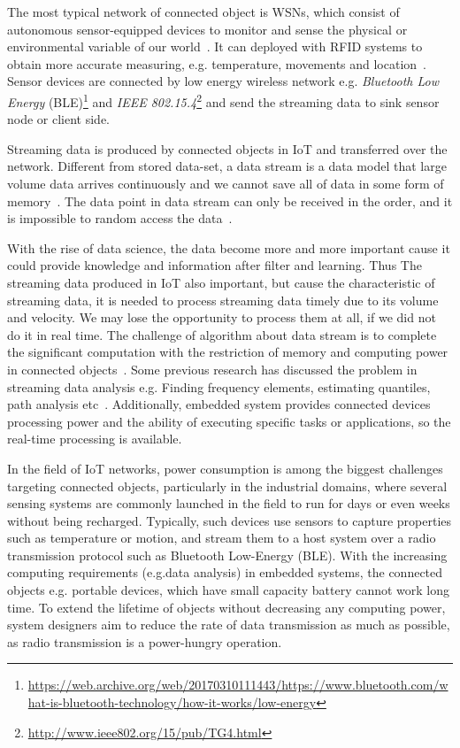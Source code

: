 The most typical network of connected object is WSNs, which consist of
autonomous sensor-equipped devices to monitor and sense the physical or
environmental variable of our world~\cite{lee2015internet, li2016temporal}. It
can deployed with RFID systems to obtain more accurate measuring, e.g.
temperature, movements and location~\cite{lee2015internet, atzori2010b}. Sensor
devices are connected by low energy wireless network e.g.
\emph{Bluetooth Low Energy}
(BLE)\footnote{\url{https://web.archive.org/web/20170310111443/https://www.bluetooth.com/what-is-bluetooth-technology/how-it-works/low-energy}}
and \emph{IEEE 802.15.4}\footnote{\url{http://www.ieee802.org/15/pub/TG4.html}}
and send the streaming data to sink sensor node or client side.

Streaming data is produced by connected objects in IoT and transferred over the
network. Different from stored data-set, a data stream is a data model that
large volume data arrives continuously and we cannot save all of data in some
form of memory~\cite{o2002streaming}. The data point in data stream can only be
received in the order, and it is impossible to random access the
data~\cite{o2002streaming}.

With the rise of data science, the data become more and more important cause it
could provide knowledge and information after filter and learning. Thus The
streaming data produced in IoT also important, but cause the characteristic of
streaming data, it is needed to process streaming data timely due to its volume
and velocity. We may lose the opportunity to process them at all, if we did not
do it in real time. The challenge of algorithm about data stream is to complete
the significant computation with the restriction of memory and computing power
in connected objects~\cite{o2002streaming}. Some previous research has discussed
the problem in streaming data analysis e.g. Finding frequency elements,
estimating quantiles, path analysis etc~\cite{kejariwal2015real}. 
Additionally, embedded system provides connected devices processing power and
the ability of executing specific tasks or applications, so the real-time
processing is available. 


In the field of IoT networks, power consumption is among the biggest challenges
targeting connected objects, particularly in the industrial domains, where
several sensing systems are commonly launched in the field to run for days or
even weeks without being recharged. Typically, such devices use sensors to
capture properties such as temperature or motion, and stream them to a host
system over a radio transmission protocol such as Bluetooth Low-Energy (BLE).
With the increasing computing requirements (e.g.data analysis) in embedded
systems, the connected objects e.g. portable devices, which have small capacity
battery cannot work long time. To extend the lifetime of objects without
decreasing any computing power, system designers aim to reduce the rate of data
transmission as much as possible, as radio transmission is a power-hungry
operation.

